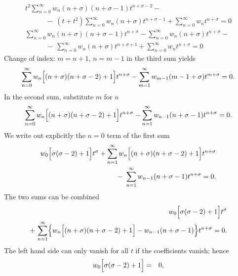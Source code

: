 {\begin{enumerate}
\begin{itemize}
\begin{equation*}
         \begin{split}
           t^2\sum_{n=0}^\infty w_n(n+\sigma)
             (n+\sigma-1)t^{n+\sigma-2}-\\
           \qquad\quad -\ (t+t^2)\sum_{n=0}^\infty
             w_n(n+\sigma)t^{n+\sigma-1}+
             \sum_{n=0}^\infty w_n t^{n+\sigma}=0\\
          \sum_{n=0}^\infty w_n(n+\sigma)(n+\sigma-1)t^{n+\sigma}-
             \sum_{n=0}^\infty w_n(n+\sigma)t^{n+\sigma}-\\
           \qquad\quad -\ \sum_{n=0}^\infty w_n(n+\sigma)
             t^{n+\sigma+1}+\sum_{n=0}^\infty w_n t^{n+\sigma}=0
         \end{split}
      \end{equation*}
      Change of index: $m=n+1$, $n=m-1$ in the third sum yields
      $$
         \sum_{n=0}^\infty w_n\Bigl[(n+\sigma)(n+\sigma-2)+1\Bigr]
         t^{n+\sigma}-
         \sum_{m=1}^\infty w_{m-1}(m-1+\sigma)t^{m+\sigma}=0.
      $$
      In the second sum, substitute $m$ for $n$
      $$
         \sum_{n=0}^\infty w_n\Bigl[(n+\sigma)(n+\sigma-2)+1\Bigr]
         t^{n+\sigma}-
         \sum_{n=1}^\infty w_{n-1}(n+\sigma-1)t^{n+\sigma}=0.
      $$
      We write out explicitly the  $n=0$ term of the first sum
      \begin{equation*}
         \begin{split}
            \displaystyle w_0\Bigl[\sigma(\sigma-2)+1\Bigr]t^\sigma+
               \sum_{n=1}^\infty w_n\Bigl[(n+\sigma)(n+\sigma-2)+1\Bigr]
               t^{n+\sigma} \\
            \displaystyle \qquad -\ \sum_{n=1}^\infty
               w_{n-1}(n+\sigma-1)t^{n+\sigma}=0.
         \end{split}
      \end{equation*}
       The two sums can be combined
      \begin{equation*}
         \begin{split}
         \displaystyle w_0\Bigl[\sigma(\sigma-2)+1\Bigr]t^\sigma \\
         \displaystyle   +\, \sum_{n=1}^\infty
            \Bigl\{w_n\Bigl[(n+\sigma)(n+\sigma-2)+1\Bigr]
            -w_{n-1}(n+\sigma-1)\Bigr\}t^{n+\sigma}=0.
         \end{split}
     \end{equation*}
      The left hand side can only vanish for all  $t$ if the coefficients vanish; hence
      \begin{eqnarray}
         w_0\Bigl[\sigma(\sigma-2)+1\Bigr]&=&0, \label{eqn:5.3.1}\\

\end{eqnarray}
\end{itemize}
\end{enumerate}}
